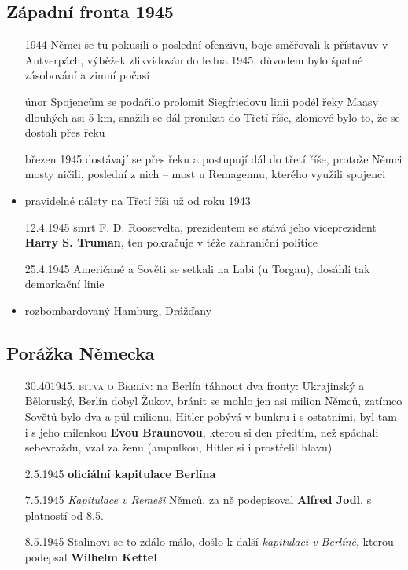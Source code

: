 \documentclass{article}
\begin{document}
\subsection*{Západní fronta 1945}
\begin{itemize}
    \item[1944] Němci se tu pokusili o poslední ofenzivu, boje směřovali k přístavuv v Antverpách, výběžek zlikvidován do ledna 1945, důvodem bylo špatné zásobování a zimní počasí
    \item[únor] Spojencům se podařilo prolomit Siegfriedovu linii podél řeky Maasy dlouhých asi 5 km, snažili se dál pronikat do Třetí říše, zlomové bylo to, že se dostali přes řeku
    \item[březen 1945] dostávají se přes řeku a postupují dál do třetí říše, protože Němci mosty ničili, poslední z nich -- most u Remagennu, kterého využili spojenci
    \item pravidelné nálety na Třetí říši už od roku 1943
    \item[12.4.1945] smrt F. D. Roosevelta, prezidentem se stává jeho viceprezident \textbf{Harry S. Truman}, ten pokračuje v téže zahraniční politice
    \item[25.4.1945] Američané a Sověti se setkali na Labi (u Torgau), dosáhli tak demarkační linie
    \item rozbombardovaný Hamburg, Drážďany
\end{itemize}

\subsection*{Porážka Německa}
\begin{itemize}
    \item[30.401945.] \textsc{bitva o Berlín}: na Berlín táhnout dva fronty: Ukrajinský a Běloruský, Berlín dobyl Žukov, bránit se mohlo jen asi milion Němců, zatímco Sovětů bylo dva a půl milionu, Hitler pobývá v bunkru i s ostatními, byl tam i s jeho milenkou \textbf{Evou Braunovou}, kterou si den předtím, než spáchali sebevraždu, vzal za ženu (ampulkou, Hitler si i prostřelil hlavu)
    \item[2.5.1945] \textbf{oficiální kapitulace Berlína}
    \item[7.5.1945] \textit{Kapitulace v Remeši} Němců, za ně podepisoval \textbf{Alfred Jodl}, s platností od 8.5.
    \item[8.5.1945] Stalinovi se to zdálo málo, došlo k další \textit{kapitulaci v Berlíně}, kterou podepsal \textbf{Wilhelm Kettel}
\end{itemize}
\end{document}
